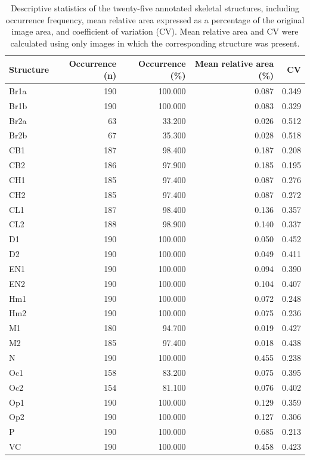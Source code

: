 \begin{table}[htbp]
\caption{Descriptive statistics of the twenty-five annotated skeletal structures, including occurrence frequency, mean relative area expressed as a percentage of the original image area, and coefficient of variation (CV). Mean relative area and CV were calculated using only images in which the corresponding structure was present.}
\label{tab:structure_statistics}
\begin{tabular}{lrrrr}
\toprule
Structure & Occurrence (n) & Occurrence (\%) & Mean relative area (\%) & CV \\
\midrule
Br1a & 190 & 100.000 & 0.087 & 0.349 \\
Br1b & 190 & 100.000 & 0.083 & 0.329 \\
Br2a & 63 & 33.200 & 0.026 & 0.512 \\
Br2b & 67 & 35.300 & 0.028 & 0.518 \\
CB1 & 187 & 98.400 & 0.187 & 0.208 \\
CB2 & 186 & 97.900 & 0.185 & 0.195 \\
CH1 & 185 & 97.400 & 0.087 & 0.276 \\
CH2 & 185 & 97.400 & 0.087 & 0.272 \\
CL1 & 187 & 98.400 & 0.136 & 0.357 \\
CL2 & 188 & 98.900 & 0.140 & 0.337 \\
D1 & 190 & 100.000 & 0.050 & 0.452 \\
D2 & 190 & 100.000 & 0.049 & 0.411 \\
EN1 & 190 & 100.000 & 0.094 & 0.390 \\
EN2 & 190 & 100.000 & 0.104 & 0.407 \\
Hm1 & 190 & 100.000 & 0.072 & 0.248 \\
Hm2 & 190 & 100.000 & 0.075 & 0.236 \\
M1 & 180 & 94.700 & 0.019 & 0.427 \\
M2 & 185 & 97.400 & 0.018 & 0.438 \\
N & 190 & 100.000 & 0.455 & 0.238 \\
Oc1 & 158 & 83.200 & 0.075 & 0.395 \\
Oc2 & 154 & 81.100 & 0.076 & 0.402 \\
Op1 & 190 & 100.000 & 0.129 & 0.359 \\
Op2 & 190 & 100.000 & 0.127 & 0.306 \\
P & 190 & 100.000 & 0.685 & 0.213 \\
VC & 190 & 100.000 & 0.458 & 0.423 \\
\bottomrule
\end{tabular}
\end{table}
